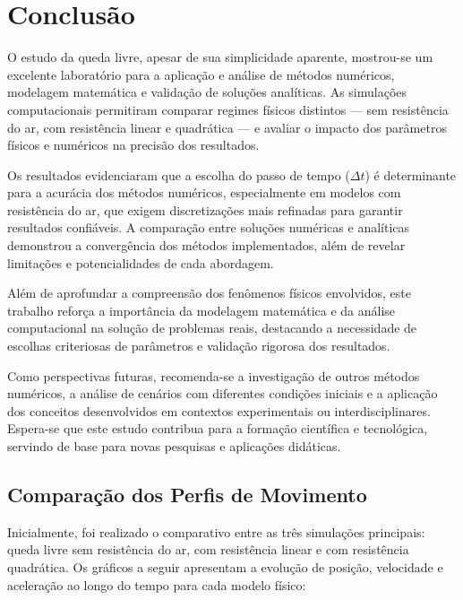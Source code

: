 

\chapter{Conclusão}
\label{chap_conclusao}


O estudo da queda livre, apesar de sua simplicidade aparente, mostrou-se um excelente laboratório para a aplicação e análise de métodos numéricos, modelagem matemática e validação de soluções analíticas. As simulações computacionais permitiram comparar regimes físicos distintos — sem resistência do ar, com resistência linear e quadrática — e avaliar o impacto dos parâmetros físicos e numéricos na precisão dos resultados.

Os resultados evidenciaram que a escolha do passo de tempo ($\Delta t$) é determinante para a acurácia dos métodos numéricos, especialmente em modelos com resistência do ar, que exigem discretizações mais refinadas para garantir resultados confiáveis. A comparação entre soluções numéricas e analíticas demonstrou a convergência dos métodos implementados, além de revelar limitações e potencialidades de cada abordagem.

Além de aprofundar a compreensão dos fenômenos físicos envolvidos, este trabalho reforça a importância da modelagem matemática e da análise computacional na solução de problemas reais, destacando a necessidade de escolhas criteriosas de parâmetros e validação rigorosa dos resultados.

Como perspectivas futuras, recomenda-se a investigação de outros métodos numéricos, a análise de cenários com diferentes condições iniciais e a aplicação dos conceitos desenvolvidos em contextos experimentais ou interdisciplinares. Espera-se que este estudo contribua para a formação científica e tecnológica, servindo de base para novas pesquisas e aplicações didáticas.
 

\section*{Comparação dos Perfis de Movimento}

Inicialmente, foi realizado o comparativo entre as três simulações principais: queda livre sem resistência do ar, com resistência linear e com resistência quadrática. Os gráficos a seguir apresentam a evolução de posição, velocidade e aceleração ao longo do tempo para cada modelo físico:

